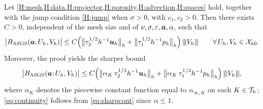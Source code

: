 \begin{lemma}[Continuity]\label{lem:continuity}
Let \cref{H:mesh,H:data,H:projector,H:porosity,H:advection,H:spaces} hold, together with the jump condition \cref{H:jump} when $\sigma>0$, with $c_1,c_2>0$. Then there exists $C>0$,
independent of the mesh size and of $\nu,\sigma,\varepsilon,\boldsymbol{a},\alpha$, such that
\begin{equation}\label{eq:continuity}
  \bigl\lvert B_{\mathrm{ASGS}} (\boldsymbol{a}; U_h,V_h)\bigr\rvert
  \le C\Bigl(
  \bigl\lVert\tau_2^{1/2}h^{-1}\boldsymbol{u}_h\bigr\rVert_h
  + \bigl\lVert\tau_1^{1/2}h^{-1}p_h\bigr\rVert_h
  \Bigr)\,{\lvert\kern-0.25ex\lvert\kern-0.25ex\lvert V_h \rvert\kern-0.25ex\rvert\kern-0.25ex\rvert}
  \qquad\forall\, U_h,V_h\in\mathcal{X}_{h0} .
\end{equation}
Moreover, the proof yields the sharper bound
\begin{equation}\label{eq:sharpcont}
  \bigl\lvert B_{\mathrm{ASGS}} (\boldsymbol{a}; U_h,V_h)\bigr\rvert
  \le C\Bigl(
  \bigl\lVert\alpha_K\,\tau_2^{1/2}h^{-1}\boldsymbol{u}_h\bigr\rVert_h
  + \bigl\lVert\alpha_K\,\tau_1^{1/2}h^{-1}p_h\bigr\rVert_h
  \Bigr)\,{\lvert\kern-0.25ex\lvert\kern-0.25ex\lvert V_h \rvert\kern-0.25ex\rvert\kern-0.25ex\rvert},
\end{equation}
where $\alpha_K$ denotes the piecewise constant function equal to $\alpha_{\infty,K}$ on
each $K\in\mathcal{T}_h$; \eqref{eq:continuity} follows from \eqref{eq:sharpcont} since
$\alpha\le 1$.
\end{lemma}

